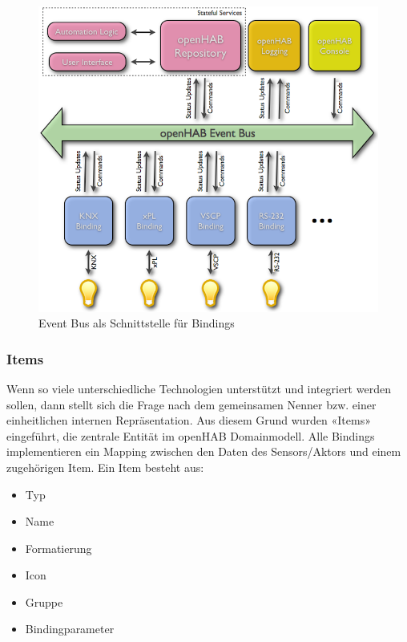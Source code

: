 \begin{figure}[H]
	\centering
		\includegraphics[scale=0.4]{report/img/communicationOH}
	\caption{Event Bus als Schnittstelle für Bindings}
	\label{fig:ohComm}
\end{figure}



\subsubsection{Items}
Wenn so viele unterschiedliche Technologien unterstützt und integriert werden sollen, dann stellt sich die Frage nach dem gemeinsamen Nenner bzw. einer einheitlichen internen Repräsentation. Aus diesem Grund wurden «Items» eingeführt, die zentrale Entität im openHAB Domainmodell. Alle Bindings implementieren ein Mapping zwischen den Daten des Sensors/Aktors und einem zugehörigen Item. Ein Item besteht aus:

\begin{itemize}
	\item Typ
	\item Name
	\item Formatierung
	\item Icon
	\item Gruppe
	\item Bindingparameter
\end{itemize}

